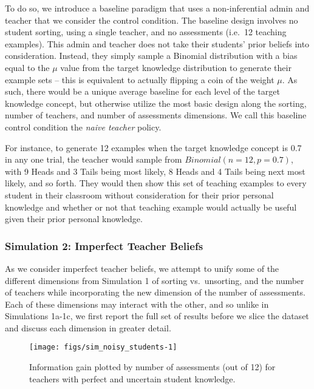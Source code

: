 \documentclass[10pt, letterpaper]{apa6}
\newenvironment{CodeChunk}{}{}
\begin{document}
To do so, we introduce a baseline paradigm that uses a non-inferential
admin and teacher that we consider the control condition. The baseline
design involves no student sorting, using a single teacher, and no
assessments (i.e.~12 teaching examples). This admin and teacher does not
take their students' prior beliefs into consideration. Instead, they
simply sample a Binomial distribution with a bias equal to the \(\mu\)
value from the target knowledge distribution to generate their example
sets -- this is equivalent to actually flipping a coin of the weight
\(\mu\). As such, there would be a unique average baseline for each
level of the target knowledge concept, but otherwise utilize the most
basic design along the sorting, number of teachers, and number of
assessments dimensions. We call this baseline control condition the
\emph{naive teacher} policy.

For instance, to generate 12 examples when the target knowledge concept
is 0.7 in any one trial, the teacher would sample from
\(Binomial(n=12, p=0.7)\), with 9 Heads and 3 Tails being most likely, 8
Heads and 4 Tails being next most likely, and so forth. They would then
show this set of teaching examples to every student in their classroom
without consideration for their prior personal knowledge and whether or
not that teaching example would actually be useful given their prior
personal knowledge.

\subsubsection{Simulation 2: Imperfect Teacher
Beliefs}\label{simulation-2-imperfect-teacher-beliefs}

As we consider imperfect teacher beliefs, we attempt to unify some of
the different dimensions from Simulation 1 of sorting vs.~unsorting, and
the number of teachers while incorporating the new dimension of the
number of assessments. Each of these dimensions may interact with the
other, and so unlike in Simulations 1a-1c, we first report the full set
of results before we slice the dataset and discuss each dimension in
greater detail.

\begin{CodeChunk}
\begin{figure*}[t]
\texttt{[image: figs/sim\_noisy\_students-1]} \caption[Information gain plotted by number of assessments (out of 12) for teachers with perfect and uncertain student knowledge]{Information gain plotted by number of assessments (out of 12) for teachers with perfect and uncertain student knowledge.}\label{fig:sim_noisy_students}
\end{figure*}
\end{CodeChunk}
\end{document}
